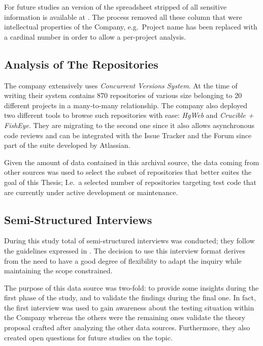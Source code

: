 For future studies an version of the spreadsheet stripped of all sensitive information is available at . The process removed all these column that were intellectual properties of the Company, e.g.\ Project name has been replaced with a cardinal number in order to allow a per-project analysis.


\subsection{Analysis of The Repositories} \label{analysis_of_the_repos}
The company extensively uses \textit{Concurrent Versions System}. At the time of writing their system contains 870 repositories of various size belonging to 20 different projects in a many-to-many relationship. The company also deployed two different tools to browse such repositories with ease: \textit{HgWeb} and \textit{Crucible + FishEye}. They are migrating to the second one since it also allows asynchronous code reviews and can be integrated with the Issue Tracker and the Forum since part of the suite developed by Atlassian.

Given the amount of data contained in this archival source, the data coming from other sources was used to select the subset of repositories that better suites the goal of this Thesis; I.e.\ a selected number of repositories targeting test code that are currently under active development or maintenance.


\subsection{Semi-Structured Interviews} \label{semi-structured_interviews}
During this study total of  semi-structured interviews was conducted; they follow the guidelines expressed in \cite{interview_guideline}. The decision to use this interview format derives from the need to have a good degree of flexibility to adapt the inquiry while maintaining the scope constrained.

The purpose of this data source was two-fold: to provide  some insights during the first phase of the study, and to validate the findings during the final one. In fact, the first interview was used to gain awareness about the testing situation within the Company whereas the others were the remaining ones validate the theory proposal crafted after analyzing the other data sources. Furthermore, they also created open questions for future studies on the topic.


